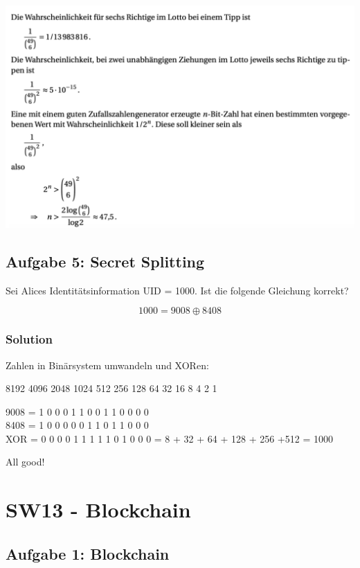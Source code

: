 \documentclass[11pt]{article}
\begin{document}
\includegraphics{img/bitcsol.png}

\newpage

    \hypertarget{aufgabe-5-secret-splitting}{%
\subsection{Aufgabe 5: Secret
Splitting}\label{aufgabe-5-secret-splitting}}

Sei Alices Identitätsinformation UID = 1000. Ist die folgende Gleichung
korrekt?

\[1000 = 9008 \oplus 8408\]

\hypertarget{solution}{%
\subsubsection{Solution}\label{solution}}

Zahlen in Binärsystem umwandeln und XORen:

8192 4096 2048 1024 512 256 128 64 32 16 8 4 2 1

9008 = 1 0 0 0 1 1 0 0 1 1 0 0 0 0\\
8408 = 1 0 0 0 0 0 1 1 0 1 1 0 0 0\\
XOR = 0 0 0 0 1 1 1 1 1 0 1 0 0 0 = 8 + 32 + 64 + 128 + 256 +512 = 1000

All good!

    

    \hypertarget{sw13---blockchain}{%
\section{SW13 - Blockchain}\label{sw13---blockchain}}

    \hypertarget{aufgabe-1-blockchain}{%
\subsection{Aufgabe 1: Blockchain}\label{aufgabe-1-blockchain}}
\end{document}
